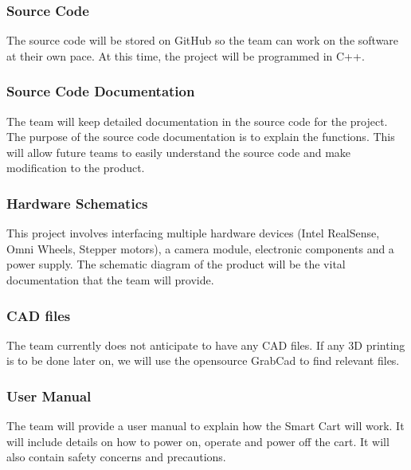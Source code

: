 \subsubsection{Source Code}
The source code will be stored on GitHub so the team can work on the software at their own pace. At this time, the project will be programmed in C++.

\subsubsection{Source Code Documentation}
The team will keep detailed documentation in the source code for the project. The purpose of the source code documentation is to explain the functions. This will allow future teams to easily understand the source code and make modification to the product.

\subsubsection{Hardware Schematics}
This project involves interfacing multiple hardware devices (Intel RealSense, Omni Wheels, Stepper motors), a camera module, electronic components and a power supply. The schematic diagram of the product will be the vital documentation that the team will provide.

\subsubsection{CAD files}
The team currently does not anticipate to have any CAD files. If any 3D printing is to be done later on, we will use the opensource GrabCad to find relevant files.

\subsubsection{User Manual}
The team will provide a user manual to explain how the Smart Cart will work. It will include details on how to power on, operate and power off the cart. It will also contain safety concerns and precautions.